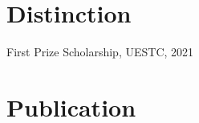 \documentclass{article}
\begin{document}










\section*{Distinction}
\indent


First Prize Scholarship, UESTC, 2021







\section*{Publication}








\end{document}
